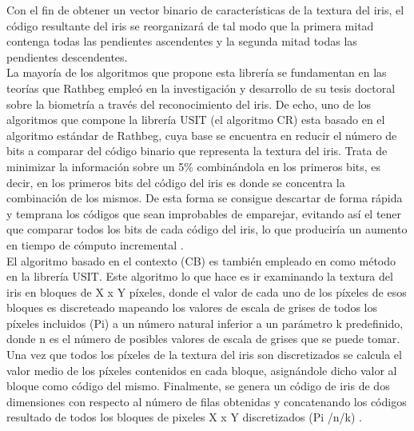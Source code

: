 Con el fin de obtener un vector binario de características de la textura del iris, el código resultante del iris se reorganizará de tal modo que la primera mitad contenga todas las pendientes ascendentes y la segunda mitad todas las pendientes descendentes. \\

La mayoría de los algoritmos que propone esta librería se fundamentan en las teorías que Rathbeg empleó en la investigación y desarrollo de su tesis doctoral sobre la biometría a través del reconocimiento del iris. De echo, uno de los algoritmos que compone la librería USIT (el algoritmo CR) esta basado en el algoritmo estándar de Rathbeg, cuya base se encuentra en reducir el número de bits a comparar del código binario que representa la textura del iris. Trata de minimizar la información sobre un 5\% combinándola en los primeros bits, es decir, en los primeros bits del código del iris es donde se concentra la combinación de los mismos. De esta forma se consigue descartar de forma rápida y temprana los códigos que sean improbables de emparejar, evitando así el tener que comparar todos los bits de cada código del iris, lo que produciría un aumento en tiempo de cómputo incremental \cite{Reference18} \cite{Reference19}.\\

El algoritmo basado en el contexto (CB) es también empleado en como método en la librería USIT. Este algoritmo lo que hace es ir examinando la textura del iris en bloques de X x Y píxeles, donde el valor de cada uno de los píxeles de esos bloques es discreteado mapeando los valores de escala de grises de todos los píxeles incluidos (Pi) a un número natural inferior a un parámetro k predefinido, donde n es el número de posibles valores de escala de grises que se puede tomar. Una vez que todos los píxeles de la textura del iris son discretizados se calcula el valor medio de los píxeles contenidos en cada bloque, asignándole dicho valor al bloque como código del mismo. Finalmente, se genera un código de iris de dos dimensiones con respecto al número de filas obtenidas y concatenando los códigos resultado de todos los bloques de pixeles X x Y discretizados (Pi /n/k) \cite{Reference18} \cite{Reference19}. \\
 
